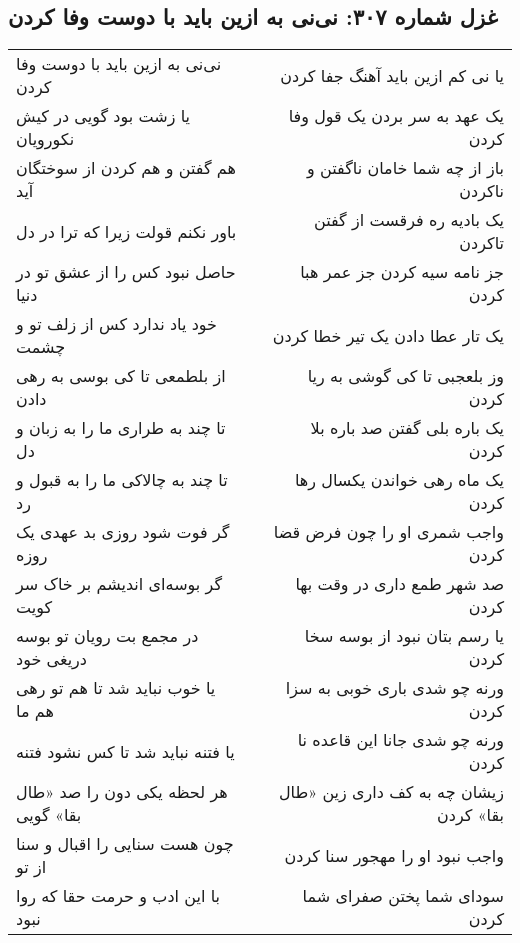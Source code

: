 \begin{center}
\section*{غزل شماره ۳۰۷: نی‌نی به ازین باید با دوست وفا کردن}
\label{sec:307}
\begin{longtable}{l p{0.5cm} r}
نی‌نی به ازین باید با دوست وفا کردن
&&
یا نی کم ازین باید آهنگ جفا کردن
\\
یا زشت بود گویی در کیش نکورویان
&&
یک عهد به سر بردن یک قول وفا کردن
\\
هم گفتن و هم کردن از سوختگان آید
&&
باز از چه شما خامان ناگفتن و ناکردن
\\
باور نکنم قولت زیرا که ترا در دل
&&
یک بادیه ره فرقست از گفتن تاکردن
\\
حاصل نبود کس را از عشق تو در دنیا
&&
جز نامه سیه کردن جز عمر هبا کردن
\\
خود یاد ندارد کس از زلف تو و چشمت
&&
یک تار عطا دادن یک تیر خطا کردن
\\
از بلطمعی تا کی بوسی به رهی دادن
&&
وز بلعجبی تا کی گوشی به ریا کردن
\\
تا چند به طراری ما را به زبان و دل
&&
یک باره بلی گفتن صد باره بلا کردن
\\
تا چند به چالاکی ما را به قبول و رد
&&
یک ماه رهی خواندن یکسال رها کردن
\\
گر فوت شود روزی بد عهدی یک روزه
&&
واجب شمری او را چون فرض قضا کردن
\\
گر بوسه‌ای اندیشم بر خاک سر کویت
&&
صد شهر طمع داری در وقت بها کردن
\\
در مجمع بت رویان تو بوسه دریغی خود
&&
یا رسم بتان نبود از بوسه سخا کردن
\\
یا خوب نباید شد تا هم تو رهی هم ما
&&
ورنه چو شدی باری خوبی به سزا کردن
\\
یا فتنه نباید شد تا کس نشود فتنه
&&
ورنه چو شدی جانا این قاعده نا کردن
\\
هر لحظه یکی دون را صد «طال بقا» گویی
&&
زیشان چه به کف داری زین «طال بقا» کردن
\\
چون هست سنایی را اقبال و سنا از تو
&&
واجب نبود او را مهجور سنا کردن
\\
با این ادب و حرمت حقا که روا نبود
&&
سودای شما پختن صفرای شما کردن
\\
\end{longtable}
\end{center}
